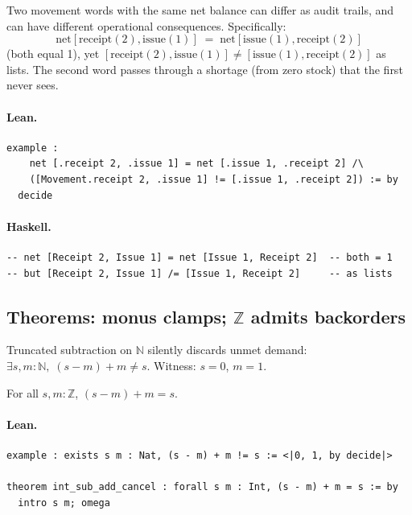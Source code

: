 \documentclass[11pt,a4paper]{article}
\begin{document}
\begin{prop}
Two movement words with the same net balance can differ as audit trails, and
can have different operational consequences.  Specifically:
\[
  \mathrm{net}[\mathrm{receipt}(2), \mathrm{issue}(1)]
  \;=\; \mathrm{net}[\mathrm{issue}(1), \mathrm{receipt}(2)]
\]
(both equal 1), yet $[\mathrm{receipt}(2), \mathrm{issue}(1)] \neq
[\mathrm{issue}(1), \mathrm{receipt}(2)]$ as lists.  The second word passes
through a shortage (from zero stock) that the first never sees.
\end{prop}

\paragraph{Lean.}
\begin{lstlisting}[style=lean]
example :
    net [.receipt 2, .issue 1] = net [.issue 1, .receipt 2] /\
    ([Movement.receipt 2, .issue 1] != [.issue 1, .receipt 2]) := by
  decide
\end{lstlisting}

\paragraph{Haskell.}
\begin{lstlisting}[style=haskell]
-- net [Receipt 2, Issue 1] = net [Issue 1, Receipt 2]  -- both = 1
-- but [Receipt 2, Issue 1] /= [Issue 1, Receipt 2]     -- as lists
\end{lstlisting}


\subsection{Theorems: monus clamps; $\mathbb{Z}$ admits backorders}

\begin{prop}
Truncated subtraction on $\mathbb{N}$ silently discards unmet demand:
$\exists s, m : \mathbb{N},\; (s - m) + m \neq s$.
Witness: $s = 0$, $m = 1$.
\end{prop}

\begin{thm}
For all $s, m : \mathbb{Z}$, $(s - m) + m = s$.
\end{thm}

\paragraph{Lean.}
\begin{lstlisting}[style=lean]
example : exists s m : Nat, (s - m) + m != s := <|0, 1, by decide|>

theorem int_sub_add_cancel : forall s m : Int, (s - m) + m = s := by
  intro s m; omega
\end{lstlisting}
\end{document}
